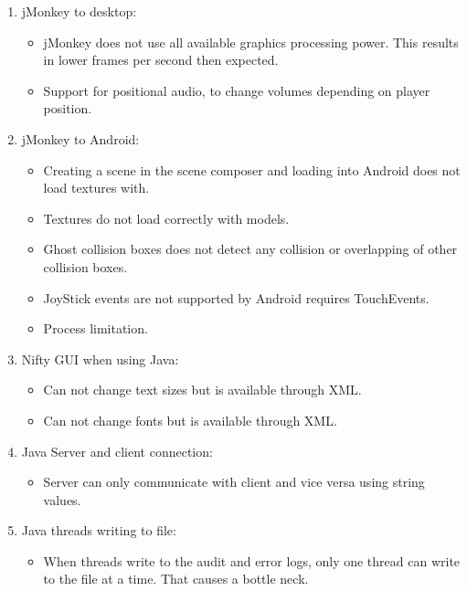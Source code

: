 \documentclass[letterpaper]{article}
\begin{document}
			\begin{enumerate}
				\item jMonkey to desktop:
					\begin{itemize}
						\item jMonkey does not use all available graphics processing power. This results in lower frames per second then expected.
						\item Support for positional audio, to change volumes depending on player position. \\
					\end{itemize}
				
				\item jMonkey to Android:
					\begin{itemize}
						\item Creating a scene in the scene composer and loading into Android does not load textures with.
						\item Textures do not load correctly with models.
						\item Ghost collision boxes does not detect any collision or overlapping of other collision boxes.
						\item JoyStick events are not supported by Android requires TouchEvents.
						\item Process limitation. \\
					\end{itemize}
				
				\item Nifty GUI when using Java:
					\begin{itemize}
						\item Can not change text sizes but is available through XML.
						\item Can not change fonts but is available through XML.
					\end{itemize}
					
					\item Java Server and client connection:
					\begin{itemize}
						\item Server can only communicate with client and vice versa using string values. 
					\end{itemize}
					\item Java threads writing to file:
					\begin{itemize}
						\item When threads write to the audit and error logs, only one thread can write to the file at a time. That causes a bottle neck. 
					\end{itemize}
			\end{enumerate}
				
\end{document}
